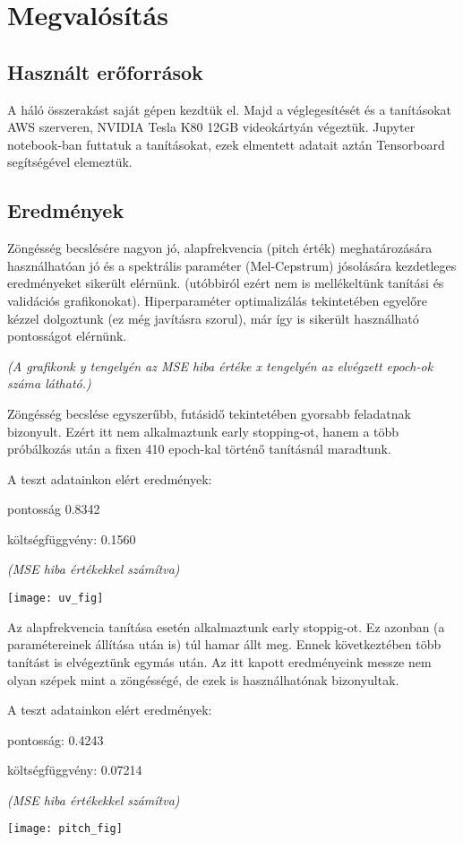 \section{Megvalósítás}
\subsection{Használt erőforrások}
A háló összerakást saját gépen kezdtük el. Majd a véglegesítését és a tanításokat AWS szerveren, NVIDIA Tesla K80 12GB videokártyán végeztük. Jupyter notebook-ban futtatuk a tanításokat, ezek elmentett adatait aztán Tensorboard segítségével elemeztük.

\subsection{Eredmények}

Zöngésség becslésére nagyon jó, alapfrekvencia (pitch érték) meghatározására használhatóan jó és a spektrális paraméter (Mel-Cepstrum) jósolására kezdetleges eredményeket sikerült elérnünk. (utóbbiról ezért nem is mellékeltünk tanítási és validációs grafikonokat). Hiperparaméter optimalizálás tekintetében egyelőre kézzel dolgoztunk (ez még javításra szorul), már így is sikerült használható pontosságot  elérnünk.

\textit{(A grafikonk y tengelyén az MSE hiba értéke x tengelyén az elvégzett epoch-ok száma látható.)}

\begin{minipage}{0.5\textwidth}
	Zöngésség becslése egyszerűbb, futásidő tekintetében gyorsabb feladatnak bizonyult. Ezért itt nem alkalmaztunk early stopping-ot, hanem a több próbálkozás után a fixen 410 epoch-kal történő tanításnál maradtunk.
	
	A teszt adatainkon elért eredmények:
	
	pontosság 0.8342
	
	költségfüggvény: 0.1560
	
	\textit{(MSE hiba értékekkel számítva)}
\end{minipage}
\begin{minipage}{0.5\textwidth}
	\flushright	
	\texttt{[image: uv\_fig]}
\end{minipage}

Az alapfrekvencia tanítása esetén alkalmaztunk early stoppig-ot. Ez azonban (a paramétereinek állítása után is) túl hamar állt meg. Ennek következtében több tanítást is elvégeztünk egymás után. Az itt kapott eredményeink messze nem olyan szépek mint a zöngésségé, de ezek is használhatónak bizonyultak.

A teszt adatainkon elért eredmények:

pontosság: 0.4243

költségfüggvény: 0.07214

\textit{(MSE hiba értékekkel számítva)}

\texttt{[image: pitch\_fig]}